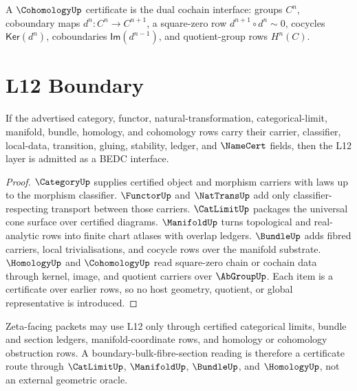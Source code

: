 \begin{definition}
\label{def:geometry-spine-cohomology}
A $\CohomologyUp$ certificate is the dual cochain interface: groups $C^n$,
coboundary maps $d^n:C^n\to C^{n+1}$, a square-zero row
$d^{n+1}\circ d^n\sim0$, cocycles $\mathsf{Ker}(d^n)$, coboundaries
$\mathsf{Im}(d^{n-1})$, and quotient-group rows $H^n(C)$.
\end{definition}

\section{L12 Boundary}
\label{sec:geometry-spine-boundary}

\begin{theorem}
\label{thm:geometry-spine-admission}
If the advertised category, functor, natural-transformation, categorical-limit,
manifold, bundle, homology, and cohomology rows carry their carrier,
classifier, local-data, transition, gluing, stability, ledger, and
$\NameCert$ fields, then the L12 layer is admitted as a BEDC interface.
\end{theorem}

\begin{proof}
$\CategoryUp$ supplies certified object and morphism carriers with laws up to
the morphism classifier.  $\FunctorUp$ and $\NatTransUp$ add only
classifier-respecting transport between those carriers.  $\CatLimitUp$
packages the universal cone surface over certified diagrams.  $\ManifoldUp$
turns topological and real-analytic rows into finite chart atlases with
overlap ledgers.  $\BundleUp$ adds fibred carriers, local trivialisations, and
cocycle rows over the manifold substrate.  $\HomologyUp$ and $\CohomologyUp$
read square-zero chain or cochain data through kernel, image, and quotient
carriers over $\AbGroupUp$.  Each item is a certificate over earlier rows, so
no host geometry, quotient, or global representative is introduced.
\end{proof}

\begin{principle}
\label{prin:geometry-spine-zeta-consumption}
Zeta-facing packets may use L12 only through certified categorical limits,
bundle and section ledgers, manifold-coordinate rows, and homology or
cohomology obstruction rows.  A boundary-bulk-fibre-section reading is
therefore a certificate route through $\CatLimitUp$, $\ManifoldUp$,
$\BundleUp$, and $\HomologyUp$, not an external geometric oracle.
\end{principle}
